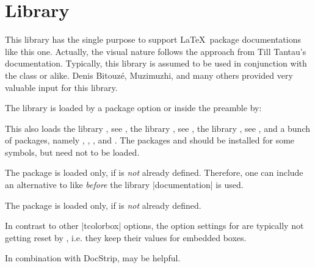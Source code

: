 \clearpage
\section{Library }\label{sec:documentation}%
%
This library has the single purpose to support \LaTeX\ package documentations
like this one. Actually, the visual nature follows the approach from
Till Tantau's  \cite{tantau:tikz_and_pgf} documentation.
Typically, this library is assumed to be used in conjunction with the
class  or alike.
Denis Bitouz\'e, Muzimuzhi, and many others provided very valuable input for this library.

The library is loaded by a package option or inside the preamble by:
\begin{dispListing}
\end{dispListing}
This also loads
the library , see ,
the library , see ,
the library , see ,
and a bunch of packages, namely
, , , and .
The packages  and  should be installed for some symbols, but
need not to be loaded.

\begin{marker}
The package  is loaded only, if  is
\emph{not} already defined. Therefore, one can include an alternative to  like
 \emph{before} the library |documentation| is used.
\end{marker}
\begin{marker}
The package  is loaded only, if  is
\emph{not} already defined.
\end{marker}
\begin{marker}
In contrast to other |tcolorbox| options, the option
settings for  are typically not
getting reset by , i.e. they keep their
values for embedded boxes.
\end{marker}
\begin{marker}
In combination with DocStrip,  may be helpful.
\end{marker}

